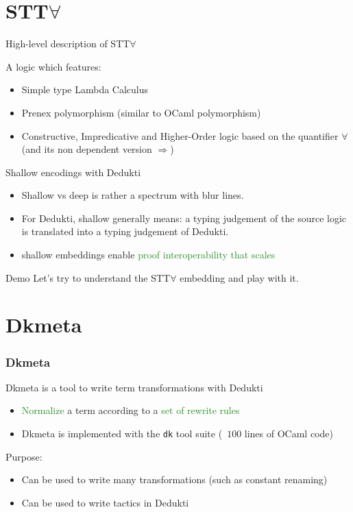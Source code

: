 \documentclass[usenames, dvipsnames]{beamer}
\newcommand{\green}[1]{\textcolor{ForestGreen}{#1}}
\newcommand{\orange}[1]{\textcolor{BurntOrange}{#1}}
\newcommand{\blue}[1]{\textcolor{NavyBlue}{#1}}
\begin{document}
\section{STT\(\forall\)}

\begin{frame}{High-level description of STT\(\forall\)}

  A logic which features:
  \begin{itemize}
  \item Simple type Lambda Calculus
  \item \blue{Prenex polymorphism} (similar to OCaml polymorphism)
  \item \blue{Constructive}, \blue{Impredicative} and
    \blue{Higher-Order} logic based on the quantifier \(\forall\) (and
    its non dependent version \(\Rightarrow\))
  \end{itemize}
\end{frame}

\begin{frame}{Shallow encodings with Dedukti}
  \begin{itemize}
  \item  Shallow vs deep is rather a \orange{spectrum} with blur lines.
  \item For Dedukti, shallow generally means: a \blue{typing
      judgement} of the source logic is translated into a typing
    judgement of Dedukti.
  \item shallow embeddings enable \green{proof interoperability that scales}
  \end{itemize}
\end{frame}

\begin{frame}{Demo}
  \large{Let's try to understand the STT\(\forall\) embedding and play with it.}
\end{frame}

\section{Dkmeta}

\begin{frame}
  \frametitle{Dkmeta}

  \orange{Dkmeta} is a tool to write term transformations with Dedukti

  \begin{itemize}
  \item \green{Normalize} a term according to a \green{set of
      rewrite rules}
  \item \orange{Dkmeta} is implemented with the \texttt{dk} tool suite (~\(100\)
    lines of OCaml code)
  \end{itemize}

  Purpose:
  \begin{itemize}
  \item Can be used to write many \blue{transformations} (such as constant renaming)
  \item Can be used to write \blue{tactics} in Dedukti
  \end{itemize}
\end{frame}
\end{document}
